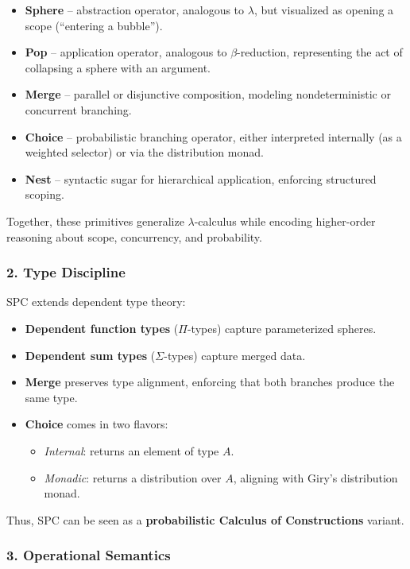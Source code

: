 \documentclass{article}
\begin{document}
\begin{itemize}
\item \textbf{Sphere} -- abstraction operator, analogous to $\lambda$, but visualized as opening a scope (``entering a bubble'').
\item \textbf{Pop} -- application operator, analogous to $\beta$-reduction, representing the act of collapsing a sphere with an argument.
\item \textbf{Merge} -- parallel or disjunctive composition, modeling nondeterministic or concurrent branching.
\item \textbf{Choice} -- probabilistic branching operator, either interpreted internally (as a weighted selector) or via the distribution monad.
\item \textbf{Nest} -- syntactic sugar for hierarchical application, enforcing structured scoping.
\end{itemize}

Together, these primitives generalize $\lambda$-calculus while encoding higher-order reasoning about scope, concurrency, and probability.

\subsubsection{2. Type Discipline}

SPC extends dependent type theory:

\begin{itemize}
\item \textbf{Dependent function types} ($\Pi$-types) capture parameterized spheres.
\item \textbf{Dependent sum types} ($\Sigma$-types) capture merged data.
\item \textbf{Merge} preserves type alignment, enforcing that both branches produce the same type.
\item \textbf{Choice} comes in two flavors:
  \begin{itemize}
  \item \textit{Internal}: returns an element of type $A$.
  \item \textit{Monadic}: returns a distribution over $A$, aligning with Giry's distribution monad.
  \end{itemize}
\end{itemize}

Thus, SPC can be seen as a \textbf{probabilistic Calculus of Constructions} variant.

\subsubsection{3. Operational Semantics}
\end{document}

